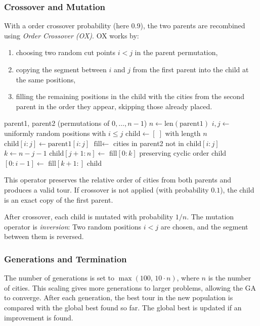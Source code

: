 \subsubsection{Crossover and Mutation}
With a order crossover probability (here 0.9), the two parents are recombined using \emph{Order Crossover (OX)}.
OX works by:
\begin{enumerate}
	\item choosing two random cut points \(i < j\) in the parent permutation,
	\item copying the segment between \(i\) and \(j\) from the first parent into the child at the same positions,
	\item filling the remaining positions in the child with the cities from the second parent in the order they appear, skipping those already placed.
\end{enumerate}

\begin{algorithm}
	\caption{Genetic: Order Crossover (OX)}
	\label{alg:ga-ox}
	\begin{algorithmic}[1]
		\REQUIRE parent1, parent2 (permutations of $0,\dots,n-1$)
		\STATE $n \gets \text{len}(\text{parent1})$
		\STATE $i,j \gets$ uniformly random positions with $i \le j$
		\STATE $\text{child} \gets [\;]$ with length $n$
		\STATE $\text{child}[i:j] \gets \text{parent1}[i:j]$
		\STATE $\text{fill} \gets$ cities in parent2 not in $\text{child}[i:j]$
		\STATE $k \gets n - j - 1$   
		\STATE child$[j + 1: n] \gets$ fill$[0: k]$ preserving cyclic order
		\STATE child$[0:i-1] \gets$ fill$[k+1:]$
		\RETURN child
	\end{algorithmic}
\end{algorithm}



This operator preserves the relative order of cities from both parents and produces a valid tour.
If crossover is not applied (with probability \(0.1\)), the child is an exact copy of the first parent.

After crossover, each child is mutated with probability \(1/n\).
The mutation operator is \emph{inversion}: Two random positions \(i < j\) are chosen, and the segment between them is reversed.

\subsubsection{Generations and Termination}
The number of generations is set to \(\max(100,\, 10 \cdot n)\), where \(n\) is the number of cities.
This scaling gives more generations to larger problems, allowing the GA to converge.
After each generation, the best tour in the new population is compared with the global best found so far.
The global best is updated if an improvement is found.

